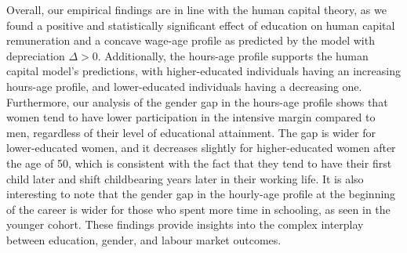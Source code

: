\documentclass[12pt]{article}
\begin{document}
Overall, our empirical findings are in line with the human capital theory, as we found a positive and statistically
significant effect of education on human capital remuneration and a concave wage-age profile as predicted by the model
with depreciation $\Delta > 0$. Additionally, the hours-age profile supports the human capital model's predictions, with
higher-educated individuals having an increasing hours-age profile, and lower-educated individuals having a decreasing
one. Furthermore, our analysis of the gender gap in the hours-age profile shows that women tend to have lower
participation in the intensive margin compared to men, regardless of their level of educational attainment. The gap is
wider for lower-educated women, and it decreases slightly for higher-educated women after the age of 50, which is
consistent with the fact that they tend to have their first child later and shift childbearing years later in their
working life. It is also interesting to note that the gender gap in the hourly-age profile at the beginning of the
career is wider for those who spent more time in schooling, as seen in the younger cohort. These findings provide
insights into the complex interplay between education, gender, and labour market outcomes.
\end{document}
